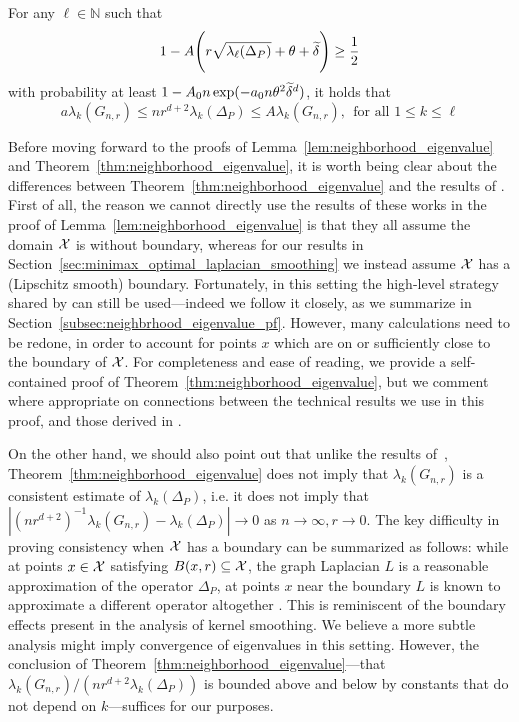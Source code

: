 \begin{theorem}
	\label{thm:neighborhood_eigenvalue}
	For any $\ell \in \mathbb{N}$ such that
	\begin{equation}
	\label{eqn:neighborhood_eigenvalue_1}
	1 - A\Biggl(r \sqrt{\lambda_{\ell}(\Delta_P)} + \theta + \widetilde{\delta}\Biggr)\geq \frac{1}{2}
	\end{equation}
	with probability at least $1 - A_0n\exp(-a_0n\theta^2\widetilde{\delta}^{d})$, it holds that
	\begin{equation}
	\label{eqn:eigenvalue_bound}
	a \lambda_k(G_{n,r}) \leq nr^{d+2} \lambda_k(\Delta_P) \leq A \lambda_k(G_{n,r}),~~\textrm{for all $1 \leq k \leq \ell$}
	\end{equation}
\end{theorem}
Before moving forward to the proofs of Lemma~\ref{lem:neighborhood_eigenvalue} and Theorem~\ref{thm:neighborhood_eigenvalue}, it is worth being clear about the differences between Theorem~\ref{thm:neighborhood_eigenvalue} and the results of \citet{burago2014,trillos2019,calder2019}. First of all, the reason we cannot directly use the results of these works in the proof of Lemma~\ref{lem:neighborhood_eigenvalue} is that they all assume the domain $\mathcal{X}$ is without boundary, whereas for our results in Section~\ref{sec:minimax_optimal_laplacian_smoothing} we instead assume $\mathcal{X}$ has a (Lipschitz smooth) boundary. Fortunately, in this setting the high-level strategy shared by \citet{burago2014,trillos2019,calder2019} can still be used---indeed we follow it closely, as we summarize in Section~\ref{subsec:neighbrhood_eigenvalue_pf}. However, many calculations need to be redone, in order to account for points $x$ which are on or sufficiently close to the boundary of $\mathcal{X}$. For completeness and ease of reading, we provide a self-contained proof of Theorem~\ref{thm:neighborhood_eigenvalue}, but we comment where appropriate on connections between the technical results we use in this proof, and those derived in \citet{burago2014,trillos2019,calder2019}.

On the other hand, we should also point out that unlike the results of~\citet{burago2014,trillos2019,calder2019}, Theorem~\ref{thm:neighborhood_eigenvalue} does not imply that $\lambda_{k}(G_{n,r})$ is a consistent estimate of $\lambda_k(\Delta_P)$, i.e. it does not imply that $|(nr^{d + 2})^{-1}\lambda_{k}(G_{n,r}) - \lambda_k(\Delta_P)| \to 0$ as $n \to \infty, r \to 0$. The key difficulty in proving consistency when $\mathcal{X}$ has a boundary can be summarized as follows: while at points $x \in \mathcal{X}$ satisfying $B(x,r) \subseteq \mathcal{X}$, the graph Laplacian $L$ is a reasonable approximation of the operator $\Delta_P$, at points $x$ near the boundary $L$ is known to approximate a different operator altogether \citep{belkin2012}. This is reminiscent of the boundary effects present in the analysis of kernel smoothing. We believe a more subtle analysis might imply convergence of eigenvalues in this setting. However, the conclusion of Theorem~\ref{thm:neighborhood_eigenvalue}---that $\lambda_k(G_{n,r})/(nr^{d + 2}\lambda_k(\Delta_P))$ is bounded above and below by constants that do not depend on $k$---suffices for our purposes.  

